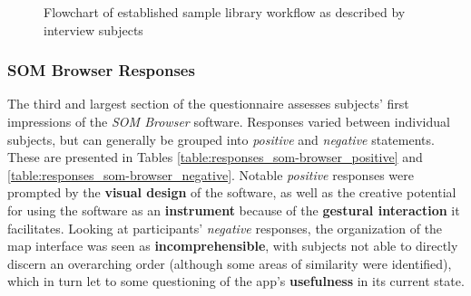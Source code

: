 \begin{figure}[!p]
\caption[Established sample library workflow]{Flowchart of established sample
library workflow as described by interview subjects}
\label{fig:results_current_workflow}
\end{figure}



\subsubsection{SOM Browser Responses}
\label{subsubsec:results_som-browser_responses}
The third and largest section of the questionnaire assesses subjects' first
impressions of the \textit{SOM Browser} software. Responses varied between
individual subjects, but can generally be grouped into \textit{positive} and
\textit{negative} statements. These are presented in Tables
\ref{table:responses_som-browser_positive} and
\ref{table:responses_som-browser_negative}. Notable \textit{positive} responses
were prompted by the \textbf{visual design} of the software, as well as the
creative potential for using the software as an \textbf{instrument} because of
the \textbf{gestural interaction} it facilitates. Looking at participants'
\textit{negative} responses, the organization of the map interface was seen as
\textbf{incomprehensible}, with subjects not able to directly discern an
overarching order (although some areas of similarity were identified), which in
turn let to some questioning of the app's \textbf{usefulness} in its current
state.

\pagebreak

